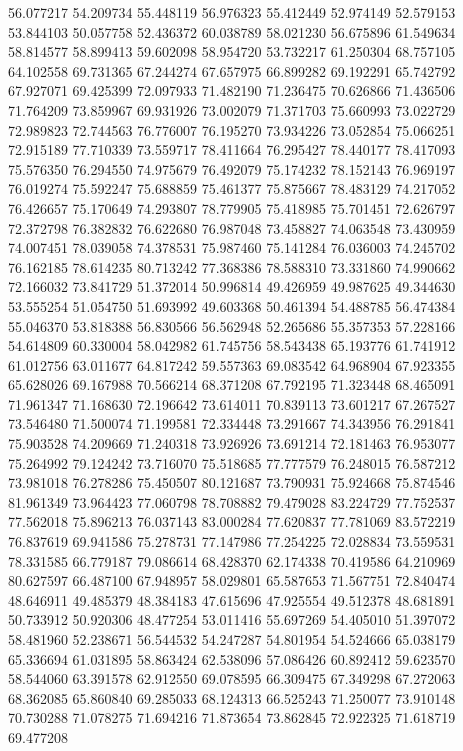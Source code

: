 56.077217
54.209734
55.448119
56.976323
55.412449
52.974149
52.579153
53.844103
50.057758
52.436372
60.038789
58.021230
56.675896
61.549634
58.814577
58.899413
59.602098
58.954720
53.732217
61.250304
68.757105
64.102558
69.731365
67.244274
67.657975
66.899282
69.192291
65.742792
67.927071
69.425399
72.097933
71.482190
71.236475
70.626866
71.436506
71.764209
73.859967
69.931926
73.002079
71.371703
75.660993
73.022729
72.989823
72.744563
76.776007
76.195270
73.934226
73.052854
75.066251
72.915189
77.710339
73.559717
78.411664
76.295427
78.440177
78.417093
75.576350
76.294550
74.975679
76.492079
75.174232
78.152143
76.969197
76.019274
75.592247
75.688859
75.461377
75.875667
78.483129
74.217052
76.426657
75.170649
74.293807
78.779905
75.418985
75.701451
72.626797
72.372798
76.382832
76.622680
76.987048
73.458827
74.063548
73.430959
74.007451
78.039058
74.378531
75.987460
75.141284
76.036003
74.245702
76.162185
78.614235
80.713242
77.368386
78.588310
73.331860
74.990662
72.166032
73.841729
51.372014
50.996814
49.426959
49.987625
49.344630
53.555254
51.054750
51.693992
49.603368
50.461394
54.488785
56.474384
55.046370
53.818388
56.830566
56.562948
52.265686
55.357353
57.228166
54.614809
60.330004
58.042982
61.745756
58.543438
65.193776
61.741912
61.012756
63.011677
64.817242
59.557363
69.083542
64.968904
67.923355
65.628026
69.167988
70.566214
68.371208
67.792195
71.323448
68.465091
71.961347
71.168630
72.196642
73.614011
70.839113
73.601217
67.267527
73.546480
71.500074
71.199581
72.334448
73.291667
74.343956
76.291841
75.903528
74.209669
71.240318
73.926926
73.691214
72.181463
76.953077
75.264992
79.124242
73.716070
75.518685
77.777579
76.248015
76.587212
73.981018
76.278286
75.450507
80.121687
73.790931
75.924668
75.874546
81.961349
73.964423
77.060798
78.708882
79.479028
83.224729
77.752537
77.562018
75.896213
76.037143
83.000284
77.620837
77.781069
83.572219
76.837619
69.941586
75.278731
77.147986
77.254225
72.028834
73.559531
78.331585
66.779187
79.086614
68.428370
62.174338
70.419586
64.210969
80.627597
66.487100
67.948957
58.029801
65.587653
71.567751
72.840474
48.646911
49.485379
48.384183
47.615696
47.925554
49.512378
48.681891
50.733912
50.920306
48.477254
53.011416
55.697269
54.405010
51.397072
58.481960
52.238671
56.544532
54.247287
54.801954
54.524666
65.038179
65.336694
61.031895
58.863424
62.538096
57.086426
60.892412
59.623570
58.544060
63.391578
62.912550
69.078595
66.309475
67.349298
67.272063
68.362085
65.860840
69.285033
68.124313
66.525243
71.250077
73.910148
70.730288
71.078275
71.694216
71.873654
73.862845
72.922325
71.618719
69.477208
